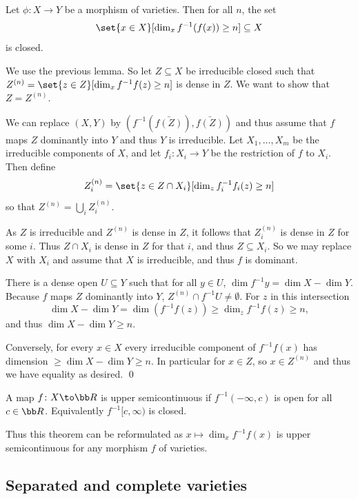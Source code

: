 \bthrm

    Let $\phi\colon X\to Y$ be a morphism of varieties.
    Then for all $n$, the set
    $$ \set{x\in X}[\dim_xf^{-1}(f(x))\geq n] \subseteq X $$
    is closed.

\ethrm

\bproof

    We use the previous lemma.
    So let $Z\subseteq X$ be irreducible closed such that $Z^{(n)}=\set{z\in Z}[\dim_xf^{-1}f(z)\geq n]$ is dense in $Z$.
    We want to show that $Z=Z^{(n)}$.

    We can replace $(X,Y)$ by $(f^{-1}(\bar{f(Z)}),\bar{f(Z)})$ and thus assume that $f$ maps $Z$ dominantly into $Y$
    and thus $Y$ is irreducible.
    Let $X_1,\dots,X_m$ be the irreducible components of $X$, and let $f_i\colon X_i\to Y$ be the restriction of $f$ to $X_i$.
    Then define
    $$ Z_i^{(n)} = \set{z\in Z\cap X_i}[\dim_zf_i^{-1}f_i(z)\geq n] $$
    so that $Z^{(n)}=\bigcup_iZ_i^{(n)}$.

    As $Z$ is irreducible and $Z^{(n)}$ is dense in $Z$, it follows that $Z_i^{(n)}$ is dense in $Z$ for some $i$.
    Thus $Z\cap X_i$ is dense in $Z$ for that $i$, and thus $Z\subseteq X_i$.
    So we may replace $X$ with $X_i$ and assume that $X$ is irreducible, and thus $f$ is dominant.

    There is a dense open $U\subseteq Y$ such that for all $y\in U$, $\dim f^{-1}y=\dim X-\dim Y$.
    Because $f$ maps $Z$ dominantly into $Y$, $Z^{(n)}\cap f^{-1}U\neq\emptyset$.
    For $z$ in this intersection
    $$ \dim X - \dim Y = \dim(f^{-1}f(z)) \geq \dim_zf^{-1}f(z) \geq n , $$
    and thus $\dim X-\dim Y\geq n$.

    Conversely, for every $x\in X$ every irreducible component of $f^{-1}f(x)$ has dimension $\geq\dim X-\dim Y\geq n$.
    In particular for $x\in Z$, so $x\in Z^{(n)}$ and thus we have equality as desired.
    \qed

\eproof

\bnote

    A map $f\colon X\to\bR$ is {\emphcolor upper semicontinuous} if $f^{-1}(-\infty,c)$ is open for all $c\in\bR$.
    Equivalently $f^{-1}[c,\infty)$ is closed.

    Thus this theorem can be reformulated as $x\mapsto\dim_xf^{-1}f(x)$ is upper semicontinuous for any morphism $f$
    of varieties.

\enote

\subsection{Separated and complete varieties}

